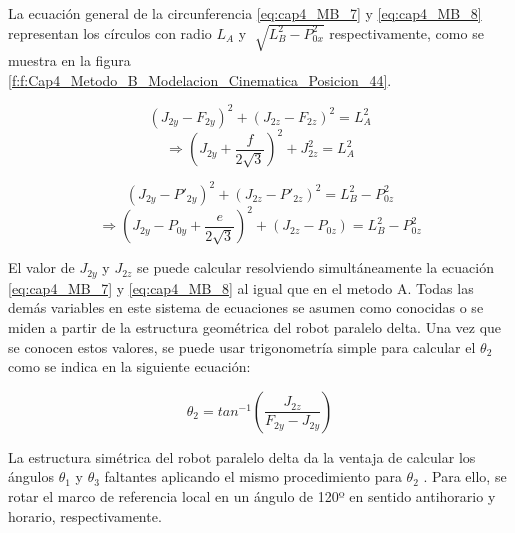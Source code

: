       La ecuación general de la circunferencia \ref{eq:cap4_MB_7} y \ref{eq:cap4_MB_8} representan los círculos con radio  \( L_{A} \)  y  \( \sqrt[]{L_{B}^{2}-P_{0x}^{2}} \)  respectivamente, como se muestra en la figura \ref{f:f:Cap4_Metodo_B_Modelacion_Cinematica_Posicion_44}.
  
  
        \begin{equation*}
              (J_{2y}-F_{2y})^2 + (J_{2z}-F_{2z})^2=  L_{A}^{2}
        \end{equation*}
        \begin{equation}
              \Rightarrow  \left (J_{2y} + \frac{f}{2\sqrt{3}}\right)^2 + J_{2z}^{2}= L_{A}^{2}
        \label{eq:cap4_MB_7}
        \end{equation}     

        \begin{equation*}
              (J_{2y}-{P'}_{2y})^2 + (J_{2z}-{P'}_{2z})^2= L_{B}^{2} -P_{0z}^2 
        \end{equation*}          
        \begin{equation}
             \Rightarrow   \left (J_{2y} - P_{0y}+ \frac{e}{2\sqrt{3}}\right)^2 + ({J}_{2z}-{P}_{0z}) = L_{B}^{2} -P_{0z}^2
        \label{eq:cap4_MB_8}
        \end{equation}  
    
    
        El valor de  \( J_{2y} \)  y  \( J_{2z} \)  se puede calcular resolviendo simultáneamente la ecuación \ref{eq:cap4_MB_7} y \ref{eq:cap4_MB_8} al igual que en el metodo A. Todas las demás variables en este sistema de ecuaciones se asumen como conocidas o se miden a partir de la estructura geométrica del robot paralelo delta. Una vez que se conocen estos valores, se puede usar trigonometría simple para calcular el  \(  \theta _{2} \)  como se indica en la siguiente ecuación:
        
        \begin{equation} 
            \theta_2=tan^{-1} \left(\frac{J_{2z}}{{F}_{2y}-{J}_{2y}}\right)
        \label{eq:cap4_MB_9}
        \end{equation}  
        \newpage

        La estructura simétrica del robot paralelo delta da la ventaja de calcular los ángulos  \(  \theta _{1} \)  y  \(  \theta _{3} \)  faltantes aplicando el mismo procedimiento para  \(  \theta _{2} \) . Para ello, se rotar el marco de referencia local en un ángulo de 120º en sentido antihorario y horario, respectivamente.   
           
